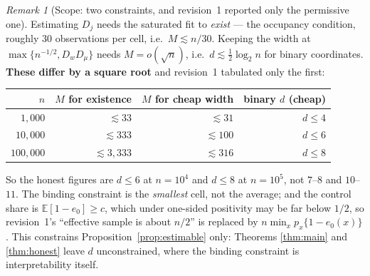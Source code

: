 \documentclass[11pt]{article}
\theoremstyle{plain}
\theoremstyle{definition}
\theoremstyle{remark}
\newtheorem{remark}{Remark}
\newcommand{\E}{\mathbb{E}}
\newcommand{\ez}{e_0}
\newcommand{\Dw}{D_w}
\newcommand{\Dm}{D_\mu}
\begin{document}
\begin{remark}[Scope: two constraints, and revision~1 reported only the permissive
one]\label{rem:scope}
Estimating $D_j$ needs the saturated fit to \emph{exist} --- the occupancy
condition, roughly $30$ observations per cell, i.e.\ $M\lesssim n/30$. Keeping the
width at $\max\{n^{-1/2},\Dw\Dm\}$ needs $M=o(\sqrt n)$, i.e.\
$d\lesssim\tfrac12\log_2n$ for binary coordinates. \textbf{These differ by a
square root} and revision~1 tabulated only the first:

\begin{center}\begin{tabular}{@{}rrrr@{}}
\toprule
$n$ & $M$ for existence & $M$ for cheap width & binary $d$ (cheap) \\ \midrule
$1{,}000$ & $\lesssim33$ & $\lesssim31$ & $d\le4$ \\
$10{,}000$ & $\lesssim333$ & $\lesssim100$ & $d\le6$ \\
$100{,}000$ & $\lesssim3{,}333$ & $\lesssim316$ & $d\le8$ \\
\bottomrule
\end{tabular}\end{center}

So the honest figures are $d\le6$ at $n=10^4$ and $d\le8$ at $n=10^5$, not $7$--$8$
and $10$--$11$. The binding constraint is the \emph{smallest} cell, not the
average; and the control share is $\E[1-\ez]\ge c$, which under one-sided
positivity may be far below $1/2$, so revision~1's ``effective sample is about
$n/2$'' is replaced by $n\min_xp_x\{1-\ez(x)\}$. This constrains
Proposition~\ref{prop:estimable} only: Theorems \ref{thm:main} and
\ref{thm:honest} leave $d$ unconstrained, where the binding constraint is
interpretability itself.
\end{remark}
\end{document}
